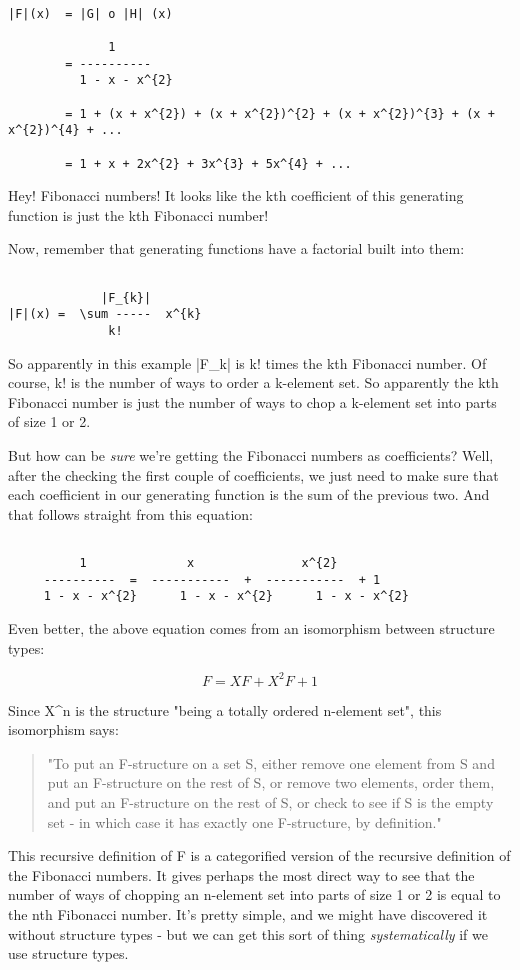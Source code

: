 \begin{verbatim}

|F|(x)  = |G| o |H| (x)

              1
        = ----------
          1 - x - x^{2}

        = 1 + (x + x^{2}) + (x + x^{2})^{2} + (x + x^{2})^{3} + (x + x^{2})^{4} + ...

        = 1 + x + 2x^{2} + 3x^{3} + 5x^{4} + ...
\end{verbatim}
    
Hey!  Fibonacci numbers!  It looks like the kth coefficient of
this generating function is just the kth Fibonacci number!

Now, remember that generating functions have a factorial built into
them:


\begin{verbatim}

             |F_{k}|  
|F|(x) =  \sum -----  x^{k}
              k!
\end{verbatim}
    
So apparently in this example |F_{k}| is k! times the kth Fibonacci
number.  Of course, k! is the number of ways to order a k-element set.
So apparently the kth Fibonacci number is just the number of ways to
chop a k-element set into parts of size 1 or 2.  

But how can be \emph{sure} we're getting the Fibonacci numbers as coefficients?  
Well, after the checking the first couple of coefficients, we just need
to make sure that each coefficient in our generating function is the sum
of the previous two.  And that follows straight from this equation:


\begin{verbatim}

          1              x               x^{2}
     ----------  =  -----------  +  -----------  + 1
     1 - x - x^{2}      1 - x - x^{2}      1 - x - x^{2}
\end{verbatim}
    
Even better, the above equation comes from an isomorphism between
structure types:


$$

          F      =       X F      +     X^{2} F     + 1
$$
    
Since X^{n} is the structure "being a totally ordered n-element set",
this isomorphism says:

\begin{quote}
      "To put an F-structure on a set S, either remove one element 
      from S and put an F-structure on the rest of S, or remove two 
      elements, order them, and put an F-structure on the rest of S,
      or check to see if S is the empty set - in which case it has
      exactly one F-structure, by definition."
\end{quote}
This recursive definition of F is a categorified version of the 
recursive definition of the Fibonacci numbers.  It gives perhaps the
most direct way to see that the number of ways of chopping an n-element 
set into parts of size 1 or 2 is equal to the nth Fibonacci number.   
It's pretty simple, and we might have discovered it without structure 
types - but we can get this sort of thing \emph{systematically} if we use
structure types.  

